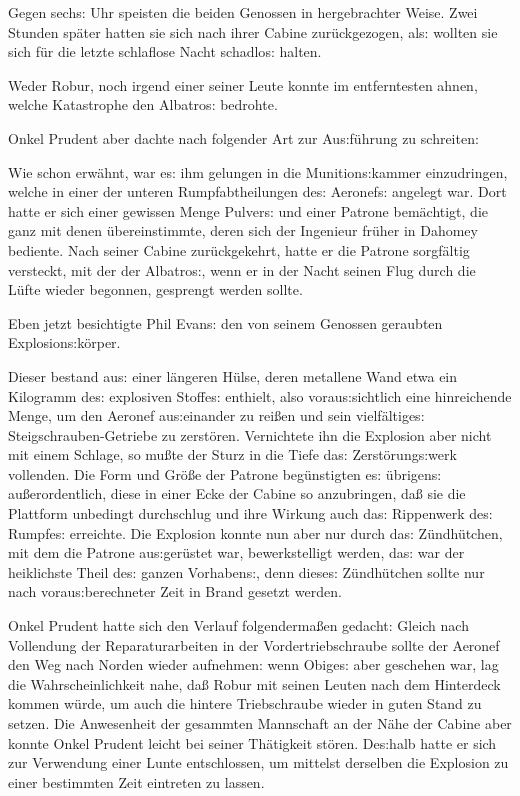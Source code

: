 \documentclass[oneside,12pt]{book}
\newcommand{\s}{s:}
\begin{document}
Gegen sech{\s} Uhr speisten die beiden Genossen in hergebrachter
Weise. Zwei Stunden sp\"ater hatten sie sich nach ihrer Cabine
zur\"uckgezogen, al{\s} wollten sie sich f\"ur die letzte schlaflose
Nacht schadlo{\s} halten.

Weder Robur, noch irgend einer seiner Leute konnte im entferntesten
ahnen, welche Katastrophe den {\glqq}Albatro{\s}{\grqq} bedrohte.

Onkel Prudent aber dachte nach folgender Art zur Au{\s}f\"uhrung zu
schreiten:

Wie schon erw\"ahnt, war e{\s} ihm gelungen in die Munition{\s}kammer
einzudringen, welche in einer der unteren Rumpfabtheilungen de{\s}
Aeronef{\s} angelegt war. Dort hatte er sich einer gewissen Menge
Pulver{\s} und einer Patrone bem\"achtigt, die ganz mit denen
\"ubereinstimmte, deren sich der Ingenieur fr\"uher in Dahomey
bediente. Nach seiner Cabine zur\"uckgekehrt, hatte er die Patrone
sorgf\"altig versteckt, mit der der {\glqq}Albatro{\s}{\grqq}, wenn
er in der Nacht seinen Flug durch die L\"ufte wieder begonnen,
gesprengt werden sollte.

Eben jetzt besichtigte Phil Evan{\s} den von seinem Genossen
geraubten Explosion{\s}k\"orper.

Dieser bestand au{\s} einer l\"angeren H\"ulse, deren metallene Wand
etwa ein Kilogramm de{\s} explosiven Stoffe{\s} enthielt, also
vorau{\s}sichtlich eine hinreichende Menge, um den Aeronef
au{\s}einander zu rei{\ss}en und sein vielf\"altige{\s}
Steigschrauben-Getriebe zu zerst\"oren. Vernichtete ihn die Explosion
aber nicht mit einem Schlage, so mu{\ss}te der Sturz in die Tiefe
da{\s} Zerst\"orung{\s}werk vollenden. Die Form und Gr\"o{\ss}e der
Patrone beg\"unstigten e{\s} \"ubrigen{\s} au{\ss}erordentlich, diese
in einer Ecke der Cabine so anzubringen, da{\ss} sie die Plattform
unbedingt durchschlug und ihre Wirkung auch da{\s} Rippenwerk de{\s}
Rumpfe{\s} erreichte. Die Explosion konnte nun aber nur durch da{\s}
Z\"undh\"utchen, mit dem die Patrone au{\s}ger\"ustet war,
bewerkstelligt werden, da{\s} war der heiklichste Theil de{\s} ganzen
Vorhaben{\s}, denn diese{\s} Z\"undh\"utchen sollte nur nach
vorau{\s}berechneter Zeit in Brand gesetzt werden.

Onkel Prudent hatte sich den Verlauf folgenderma{\ss}en gedacht: Gleich
nach Vollendung der Reparaturarbeiten in der Vordertriebschraube
sollte der Aeronef den Weg nach Norden wieder aufnehmen: wenn
Obige{\s} aber geschehen war, lag die Wahrscheinlichkeit nahe,
da{\ss} Robur mit seinen Leuten nach dem Hinterdeck kommen w\"urde,
um auch die hintere Triebschraube wieder in guten Stand zu setzen.
Die Anwesenheit der gesammten Mannschaft an der N\"ahe der Cabine
aber konnte Onkel Prudent leicht bei seiner Th\"atigkeit st\"oren.
De{\s}halb hatte er sich zur Verwendung einer Lunte entschlossen, um
mittelst derselben die Explosion zu einer bestimmten Zeit eintreten
zu lassen.
\end{document}

